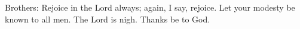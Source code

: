Brothers: Rejoice in the Lord always; again, I say, rejoice. Let your modesty be known to all men. The Lord is nigh. \rubric{\Rbar} Thanks be to God.